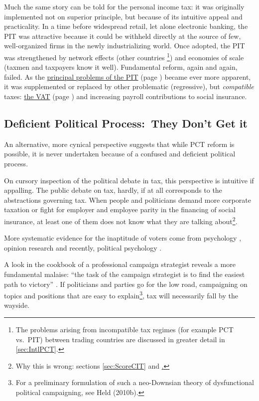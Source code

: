 Much the same story can be told for the personal income tax:
it was originally implemented not on superior principle, but because of its intuitive appeal and practicality.
In a time before widespread retail, let alone electronic banking, the PIT was attractive because it could be withheld directly at the source of few, well-organized firms in the newly industrializing world.
Once adopted, the PIT was strengthened by network effects (other countries
	\footnote{
		The problems arising from incompatible tax regimes (for example PCT vs.\ PIT) between trading countries are discussed in greater detail in \autoref{sec:IntlPCT}.}) and economies of scale (taxmen and taxpayers know it well).
Fundamental reform, again and again, failed.
As the \hyperref[sec:ScorePIT]{principal problems of the PIT} (page \pageref{sec:ScorePIT}) became ever more apparent, it was supplemented or replaced by other problematic (regressive), but \emph{compatible} taxes:
\hyperref[sec:ScoreVAT]{the VAT} (page \pageref{sec:ScoreVAT}) and increasing payroll contributions to social insurance.

\subsection[Deficient Political Process]{Deficient Political Process:\ They Don't Get it} An alternative, more cynical perspective suggests that while PCT reform is possible, it is never undertaken because of a confused and deficient political process.

On cursory inspection of the political debate in tax, this perspective is intuitive if appalling.
The public debate on tax, hardly, if at all corresponds to the abstractions governing tax.
When people and politicians demand more corporate taxation or fight for employer and employee parity in the financing of social insurance, at least one of them does not know what they are talking about\footnote{Why this is wrong:
sections \ref{sec:ScoreCIT} and \href{sec:SICAreTaxes}.}.

More systematic evidence for the inaptitude of voters come from psychology \citep{Converse-1970-aa}, opinion research \citep{Delli-CarpiniKeeter-1996-aa} and recently, political psychology \citep{Rosenberg-2002-aa}.

A look in the cookbook of a professional campaign strategist reveals a more fundamental malaise:
``the task of the campaign strategist is to find the easiest path to victory'' \citep[9]{Malchow2003}.
If politicians and parties go for the low road, campaigning on topics and positions that are easy to explain\footnote{For a preliminary formulation of such a neo-Downsian theory of dysfunctional political campaigning, see Held (2010b).}, tax will necessarily fall by the wayside.

